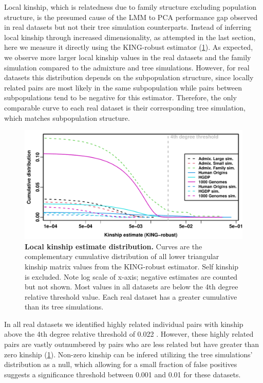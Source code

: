 \documentclass[11pt]{article}
\begin{document}
Local kinship, which is relatedness due to family structure excluding population structure, is the presumed cause of the LMM to PCA performance gap observed in real datasets but not their tree simulation counterparts.
Instead of inferring local kinship through increased dimensionality, as attempted in the last section, here we measure it directly using the KING-robust estimator (\cref{fig:king}).
As expected, we observe more larger local kinship values in the real datasets and the family simulation compared to the admixture and tree simulations.
However, for real datasets this distribution depends on the subpopulation structure, since locally related pairs are most likely in the same subpopulation while pairs between subpopulations tend to be negative for this estimator.
Therefore, the only comparable curve to each real dataset is their corresponding tree simulation, which matches subpopulation structure.

\begin{figure}[bp!]
  \centering
  \includegraphics[width=\textwidth]{king_log-x.pdf}
  \caption{
    {\bf Local kinship estimate distribution.}
    Curves are the complementary cumulative distribution of all lower triangular kinship matrix values from the KING-robust estimator.
    Self kinship is excluded.
    Note log scale of x-axis; negative estimates are counted but not shown.
    Most values in all datasets are below the 4th degree relative threshold value.
    Each real dataset has a greater cumulative than its tree simulations.
  }
  \label{fig:king}
\end{figure}

In all real datasets we identified highly related individual pairs with kinship above the 4th degree relative threshold of 0.022 \citep{manichaikul_robust_2010, conomos_model-free_2016}.
However, these highly related pairs are vastly outnumbered by pairs who are less related but have greater than zero kinship (\cref{fig:king}).
Non-zero kinship can be infered utilizing the tree simulations' distribution as a null, which allowing for a small fraction of false positives suggests a significance threshold between 0.001 and 0.01 for these datasets.
\end{document}
